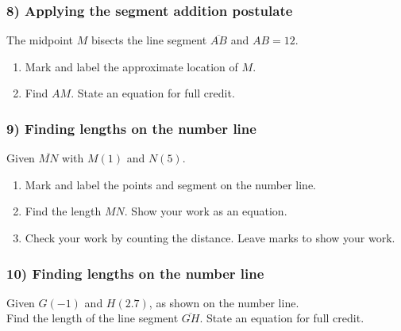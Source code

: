 \documentclass{beamer}
\begin{document}
  \frame
  {
    \frametitle{8) Applying the segment addition postulate}
      The midpoint $M$ bisects the line segment $\overline{AB}$ and $AB=12$.
      \begin{enumerate}
        \item Mark and label the approximate location of $M$.
        \item Find ${AM}$. State an equation for full credit.
      \end{enumerate} \vspace{1cm} 
      \begin{center}
      \end{center} \vspace{3cm} 
  }

  \frame
  {
    \frametitle{9) Finding lengths on the number line}
    Given $\overline{MN}$ with $M(1)$ and $N(5)$. \\[1.5cm]
      \begin{enumerate}
        \item Mark and label the points and segment on the number line.
        \item Find the length ${MN}$. Show your work as an equation.
        \item Check your work by counting the distance. Leave marks to show your work.
      \end{enumerate} \vspace{2cm}  
  }

  \frame
  {
    \frametitle{10) Finding lengths on the number line}
    Given $G(-1)$ and $H(2.7)$, as shown on the number line. \\[0.25cm]
    Find the length of the line segment $\overline{GH}$. State an equation for full credit. \\
      \vspace{4cm}  
  }
\end{document}
